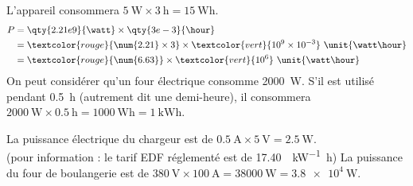 \documentclass[../Cours.tex]{subfiles}
\begin{document}
\begin{questions}
        \question 
            \subquestion L'appareil consommera $\qty{5}{\watt} \times \qty{3}{\hour} = \qty{15}{\watt\hour}$.
            \subquestion 
            \begin{align*}
                P &= \qty{2.21e9}{\watt} \times \qty{3e-3}{\hour} \\
                &= \textcolor{rouge}{\num{2.21} \times 3} \times \textcolor{vert}{10^{9} \times 10^{-3}} ~\unit{\watt\hour}\\
                &= \textcolor{rouge}{\num{6.63}} \times \textcolor{vert}{10^{6}} ~\unit{\watt\hour}\\
            \end{align*}
            \subquestion On peut considérer qu'un four électrique consomme \qty{2000}{\watt}. S'il est utilisé pendant \qty{0.5}{\hour} (autrement dit une demi-heure), il consommera $\qty{2000}{\watt} \times \qty{0.5}{\hour} = \qty{1000}{\watt\hour} = \qty{1}{\kilo\watt\hour}$.

        \question 
            \subquestion La puissance électrique du chargeur est de $\qty{0.5}{\ampere} \times \qty{5}{\volt} = \qty{2.5}{\watt}$. \\(pour information : le tarif EDF réglementé est de \qty{17.40}{\EURO\per\kilo\watt\hour})
            \subquestion La puissance du four de boulangerie est de $\qty{380}{\volt} \times \qty{100}{\ampere} = \qty{38000}{\watt} = \qty{3.8e4}{\watt}$. 

        \question 
            \subquestion 
\end{questions}
\end{document}
